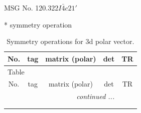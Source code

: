 \documentclass[fleqn,8pt]{jsarticle}
\begin{document}
\setcounter{MaxMatrixCols}{32}

\renewcommand{\tablename}{Table~}
\renewcommand{\figurename}{Figure~}
\begin{center}
\LARGE
MSG No. 120.322\quad$I\bar{4}c21'$
\end{center}
* symmetry operation
\renewcommand{\arraystretch}{1.3}
\begin{longtable}{ccccc}
\caption{Symmetry operations for 3d polar vector.}
 \\
 \hline \hline
No. & tag & matrix (polar) & det & TR \\ \hline \endfirsthead

\multicolumn{4}{l}{\tablename\ \thetable{}} \\
 \hline \hline
No. & tag & matrix (polar) & det & TR \\ \hline \endhead

 \hline \hline
\multicolumn{4}{r}{\footnotesize\it continued ...} \\ \endfoot

 \hline \hline
\multicolumn{4}{r}{} \\ \endlastfoot


\end{longtable}
\end{document}
